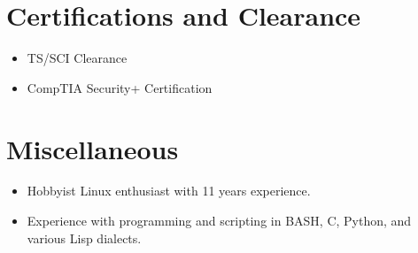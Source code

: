 \documentclass[11pt]{resume}
\begin{document}
\section{Certifications and Clearance}
\begin{itemize}
\item TS/SCI Clearance
\item CompTIA Security+ Certification
\end{itemize}

\section{Miscellaneous}
\begin{itemize}
\item Hobbyist Linux enthusiast with 11 years experience.
\item Experience with programming and scripting in BASH, C, Python, and various Lisp dialects.
\end{itemize}
\end{document}
